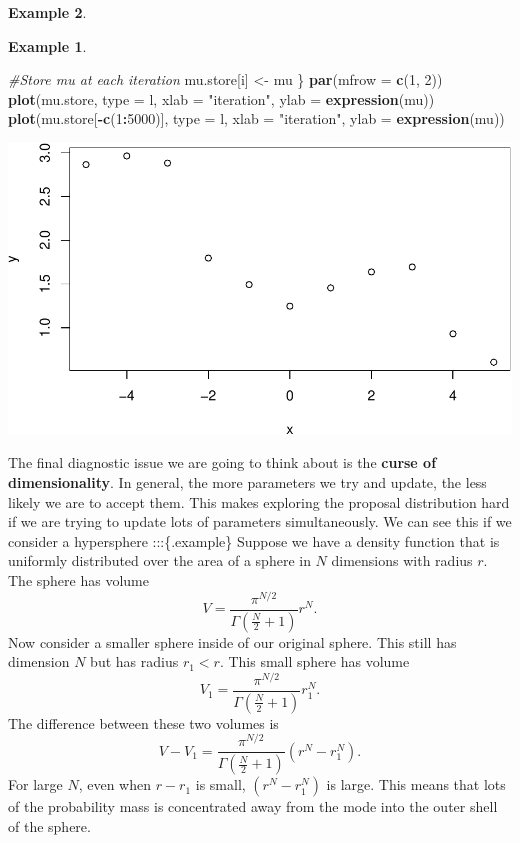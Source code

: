 \documentclass[
]{book}
\newenvironment{Shaded}{\begin{snugshade}}{\end{snugshade}}
\newcommand{\AttributeTok}[1]{\textcolor[rgb]{0.13,0.29,0.53}{#1}}
\newcommand{\CommentTok}[1]{\textcolor[rgb]{0.56,0.35,0.01}{\textit{#1}}}
\newcommand{\DecValTok}[1]{\textcolor[rgb]{0.00,0.00,0.81}{#1}}
\newcommand{\FunctionTok}[1]{\textcolor[rgb]{0.13,0.29,0.53}{\textbf{#1}}}
\newcommand{\NormalTok}[1]{#1}
\newcommand{\OtherTok}[1]{\textcolor[rgb]{0.56,0.35,0.01}{#1}}
\newcommand{\SpecialCharTok}[1]{\textcolor[rgb]{0.81,0.36,0.00}{\textbf{#1}}}
\newcommand{\StringTok}[1]{\textcolor[rgb]{0.31,0.60,0.02}{#1}}
\theoremstyle{definition}
\theoremstyle{definition}
\newtheorem{example}{Example}[chapter]
\theoremstyle{definition}
\theoremstyle{definition}
\theoremstyle{remark}
\begin{document}
\begin{example}
\begin{example}
\begin{Shaded}
\begin{Highlighting}[]
  \CommentTok{\#Store mu at each iteration}
\NormalTok{  mu.store[i] }\OtherTok{\textless{}{-}}\NormalTok{ mu}
\NormalTok{\}}
\FunctionTok{par}\NormalTok{(}\AttributeTok{mfrow =} \FunctionTok{c}\NormalTok{(}\DecValTok{1}\NormalTok{, }\DecValTok{2}\NormalTok{))}
\FunctionTok{plot}\NormalTok{(mu.store, }\AttributeTok{type =} \StringTok{\textquotesingle{}l\textquotesingle{}}\NormalTok{, }\AttributeTok{xlab =} \StringTok{"iteration"}\NormalTok{, }\AttributeTok{ylab =} \FunctionTok{expression}\NormalTok{(mu))}
\FunctionTok{plot}\NormalTok{(mu.store[}\SpecialCharTok{{-}}\FunctionTok{c}\NormalTok{(}\DecValTok{1}\SpecialCharTok{:}\DecValTok{5000}\NormalTok{)], }\AttributeTok{type =} \StringTok{\textquotesingle{}l\textquotesingle{}}\NormalTok{, }\AttributeTok{xlab =} \StringTok{"iteration"}\NormalTok{,}
     \AttributeTok{ylab =} \FunctionTok{expression}\NormalTok{(mu))}
\end{Highlighting}
\end{Shaded}

\includegraphics{_main_files/figure-latex/unnamed-chunk-45-1.pdf}
\end{example}

The final diagnostic issue we are going to think about is the \textbf{curse of dimensionality}. In general, the more parameters we try and update, the less likely we are to accept them. This makes exploring the proposal distribution hard if we are trying to update lots of parameters simultaneously. We can see this if we consider a hypersphere
:::\{.example\}
Suppose we have a density function that is uniformly distributed over the area of a sphere in \(N\) dimensions with radius \(r\). The sphere has volume
\[
V = \frac{\pi^{N/2}}{\Gamma(\frac{N}{2} + 1)}r^N.
\]
Now consider a smaller sphere inside of our original sphere. This still has dimension \(N\) but has radius \(r_1 < r\). This small sphere has volume
\[
V_1 = \frac{\pi^{N/2}}{\Gamma(\frac{N}{2} + 1)}r_1^N.
\]
The difference between these two volumes is
\[
V - V_1 = \frac{\pi^{N/2}}{\Gamma(\frac{N}{2} + 1)}(r^N - r_1^N).
\]
For large \(N\), even when \(r - r_1\) is small, \((r^N - r_1^N)\) is large. This means that lots of the probability mass is concentrated away from the mode into the outer shell of the sphere.
\end{example}
\end{document}
